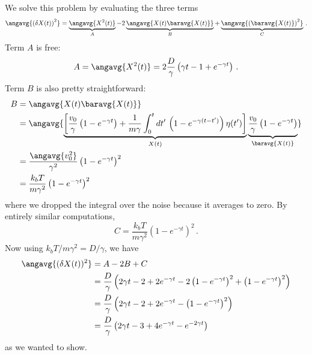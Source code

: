We solve this problem by evaluating the three terms
\begin{displaymath}
  \angavg{\left( \delta X(t) \right)^2}
  =
  \underbrace{\angavg{X^2(t)}}_A
  - 2 \underbrace{\angavg{X(t) \baravg{X(t)}}}_B
  + \underbrace{\angavg{\left( \baravg{X(t)} \right)^2}}_C
  \, .
\end{displaymath}
Term $A$ is free:
\begin{displaymath}
  A = \angavg{X^2(t)} = 2 \frac{D}{\gamma} \left( \gamma t - 1 + e^{-\gamma t} \right)
  \, .
\end{displaymath}
Term $B$ is also pretty straightforward:
\begin{align*}
  B
  &= \angavg{X(t) \baravg{X(t)}} \\
  &= \angavg{
    \underbrace{\left[ \frac{v_0}{\gamma} \left( 1 - e^{-\gamma t} \right) + \frac{1}{m \gamma} \int_0^t dt' \, \left( 1 - e^{-\gamma (t - t')} \right) \eta(t') \right]}_{X(t)}
    \underbrace{\frac{v_0}{\gamma} \left( 1 - e^{-\gamma t} \right)}_{\baravg{X(t)}}
  } \\
  &= \frac{\angavg{v_0^2}}{\gamma^2} \left( 1 - e^{-\gamma t} \right)^2 \\
  &= \frac{k_b T}{m \gamma^2} \left( 1 - e^{-\gamma t} \right)^2
\end{align*}
where we dropped the integral over the noise because it averages to zero.
By entirely similar computations,
\begin{equation*}
  C = \frac{k_b T}{m \gamma^2} \left( 1 - e^{-\gamma t} \right)^2
  \, .
\end{equation*}
Now using $k_b T / m \gamma^2 = D / \gamma$, we have
\begin{align*}
  \angavg{(\delta X(t))^2}
  &= A - 2 B + C \\
  &= \frac{D}{\gamma} \left(
    2 \gamma t - 2 + 2 e^{-\gamma t}
    - 2 \left( 1 - e^{-\gamma t} \right)^2
    + \left( 1 - e^{-\gamma t} \right)^2
  \right) \\
  &= \frac{D}{\gamma} \left(
    2 \gamma t - 2 + 2 e^{-\gamma t} - \left( 1 - e^{-\gamma t} \right)^2
  \right) \\
  &= \frac{D}{\gamma} \left(
    2 \gamma t - 3 + 4 e^{-\gamma t} - e^{-2 \gamma t}
  \right)
\end{align*}
as we wanted to show.
